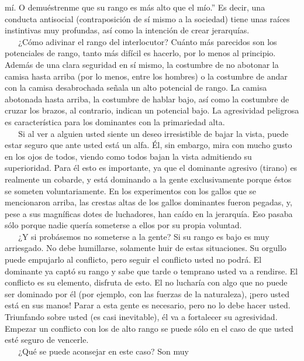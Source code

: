 mí. O demuéstrenme que su rango es más alto que el mío.'' Es decir, una
conducta antisocial (contraposición de sí mismo a la sociedad) tiene
unas raíces instintivas muy profundas, así como la intención de crear
jerarquías.\\
\hspace*{0.333em} ~ ~ ¿Cómo adivinar el rango del interlocutor? Cuánto
más parecidos son los potenciales de rango, tanto más difícil es
hacerlo, por lo menos al principio. Además de una clara seguridad en sí
mismo, la costumbre de no abotonar la camisa hasta arriba (por lo menos,
entre los hombres) o la costumbre de andar con la camisa desabrochada
señala un alto potencial de rango. La camisa abotonada hasta arriba, la
costumbre de hablar bajo, así como la costumbre de cruzar los brazos, al
contrario, indican un potencial bajo. La agresividad peligrosa es
característica para los dominantes con la primariedad alta.\\
\hspace*{0.333em} ~ ~ Si al ver a alguien usted siente un deseo
irresistible de bajar la vista, puede estar seguro que ante usted está
un alfa. Él, sin embargo, mira con mucho gusto en los ojos de todos,
viendo como todos bajan la vista admitiendo su superioridad. Para él
esto es importante, ya que el dominante agresivo (tirano) es realmente
un cobarde, y está dominando a la gente exclusivamente porque éstos se
someten voluntariamente. En los experimentos con los gallos que se
mencionaron arriba, las crestas altas de los gallos dominantes fueron
pegadas, y, pese a sus magníficas dotes de luchadores, han caído en la
jerarquía. Eso pasaba sólo porque nadie quería someterse a ellos por su
propia voluntad.\\
\hspace*{0.333em} ~ ~ ¿Y si probásemos no someterse a la gente? Si su
rango es bajo es muy arriesgado. No debe humillarse, solamente huir de
estas situaciones. Su orgullo puede empujarlo al conflicto, pero seguir
el conflicto usted no podrá. El dominante ya captó su rango y sabe que
tarde o temprano usted va a rendirse. El conflicto es su elemento,
disfruta de esto. El no lucharía con algo que no puede ser dominado por
él (por ejemplo, con las fuerzas de la naturaleza), ¡pero usted está en
sus manos! Parar a esta gente es necesario, pero no lo debe hacer usted.
Triunfando sobre usted (es casi inevitable), él va a fortalecer su
agresividad. Empezar un conflicto con los de alto rango se puede sólo en
el caso de que usted esté seguro de vencerle.\\
\hspace*{0.333em} ~ ~ ¿Qué se puede aconsejar en este caso? Son muy
